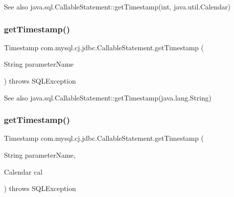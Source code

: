 \begin{DoxySeeAlso}{See also}
java.\+sql.\+Callable\+Statement\+::get\+Timestamp(int, java.\+util.\+Calendar) 
\end{DoxySeeAlso}
\mbox{\label{classcom_1_1mysql_1_1cj_1_1jdbc_1_1_callable_statement_ad259b38c5fa0c1d844e7a2a2d78c420f}} 
\subsubsection{\texorpdfstring{get\+Timestamp()}{getTimestamp()}\hspace{0.1cm}{\footnotesize\ttfamily [3/4]}}
{\footnotesize\ttfamily Timestamp com.\+mysql.\+cj.\+jdbc.\+Callable\+Statement.\+get\+Timestamp (\begin{DoxyParamCaption}\item[{String}]{parameter\+Name }\end{DoxyParamCaption}) throws S\+Q\+L\+Exception}

\begin{DoxySeeAlso}{See also}
java.\+sql.\+Callable\+Statement\+::get\+Timestamp(java.\+lang.\+String) 
\end{DoxySeeAlso}
\mbox{\label{classcom_1_1mysql_1_1cj_1_1jdbc_1_1_callable_statement_ae256b922dcf07dac53e51154a618f1c3}} 
\subsubsection{\texorpdfstring{get\+Timestamp()}{getTimestamp()}\hspace{0.1cm}{\footnotesize\ttfamily [4/4]}}
{\footnotesize\ttfamily Timestamp com.\+mysql.\+cj.\+jdbc.\+Callable\+Statement.\+get\+Timestamp (\begin{DoxyParamCaption}\item[{String}]{parameter\+Name,  }\item[{Calendar}]{cal }\end{DoxyParamCaption}) throws S\+Q\+L\+Exception}

